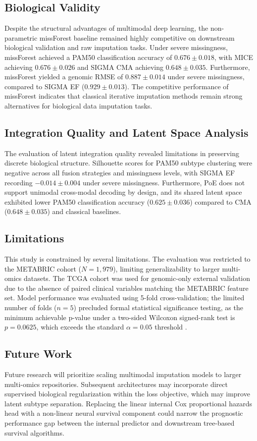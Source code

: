 \documentclass[final,3p,times,authoryear]{elsarticle}
\begin{document}
\subsection{Biological Validity}
Despite the structural advantages of multimodal deep learning, the non-parametric missForest baseline remained highly competitive on downstream biological validation and raw imputation tasks. Under severe missingness, missForest achieved a PAM50 classification accuracy of $0.676 \pm 0.018$, with MICE achieving $0.676 \pm 0.026$ and SIGMA CMA achieving $0.648 \pm 0.035$. Furthermore, missForest yielded a genomic RMSE of $0.887 \pm 0.014$ under severe missingness, compared to SIGMA EF ($0.929 \pm 0.013$). The competitive performance of missForest indicates that classical iterative imputation methods remain strong alternatives for biological data imputation tasks.

\subsection{Integration Quality and Latent Space Analysis}
The evaluation of latent integration quality revealed limitations in preserving discrete biological structure. Silhouette scores for PAM50 subtype clustering were negative across all fusion strategies and missingness levels, with SIGMA EF recording $-0.014 \pm 0.004$ under severe missingness. Furthermore, PoE does not support unimodal cross-modal decoding by design, and its shared latent space exhibited lower PAM50 classification accuracy ($0.625 \pm 0.036$) compared to CMA ($0.648 \pm 0.035$) and classical baselines.

\subsection{Limitations}
This study is constrained by several limitations. The evaluation was restricted to the METABRIC cohort ($N=1{,}979$), limiting generalizability to larger multi-omics datasets. The TCGA cohort was used for genomic-only external validation due to the absence of paired clinical variables matching the METABRIC feature set. Model performance was evaluated using 5-fold cross-validation; the limited number of folds ($n=5$) precluded formal statistical significance testing, as the minimum achievable p-value under a two-sided Wilcoxon signed-rank test is $p=0.0625$, which exceeds the standard $\alpha=0.05$ threshold \citep{conover1999practical}.

\subsection{Future Work}
Future research will prioritize scaling multimodal imputation models to larger multi-omics repositories. Subsequent architectures may incorporate direct supervised biological regularization within the loss objective, which may improve latent subtype separation. Replacing the linear internal Cox proportional hazards head with a non-linear neural survival component could narrow the prognostic performance gap between the internal predictor and downstream tree-based survival algorithms.
\end{document}
